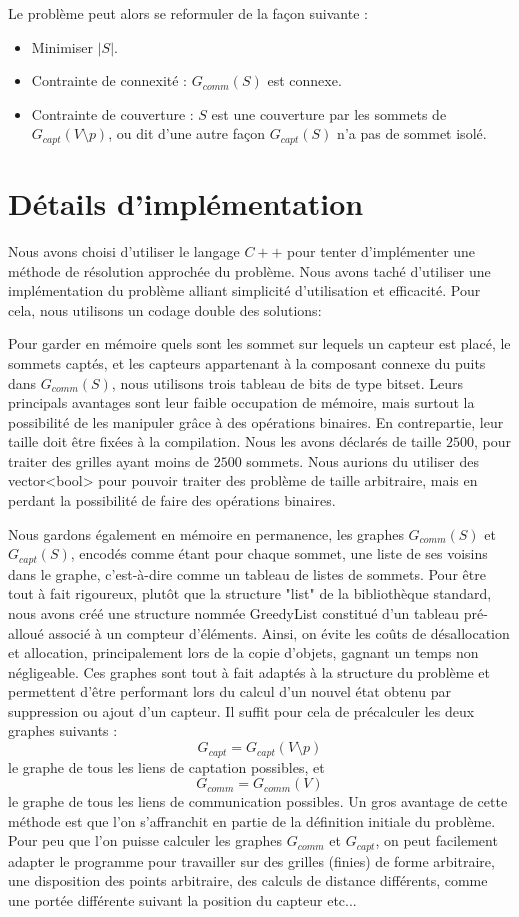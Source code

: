 \documentclass[12pt,a4paper]{article}
\begin{document}
Le problème peut alors se reformuler de la façon suivante :
\begin{itemize}
\item Minimiser $|S|$.
\item Contrainte de connexité : $G_{comm}(S)$ est connexe.
\item Contrainte de couverture : $S$ est une couverture par les sommets de $G_{capt}(V\setminus p)$, ou dit d'une autre façon $G_{capt}(S)$ n'a pas de sommet isolé.
\end{itemize}
\section{Détails d'implémentation}
Nous avons choisi d'utiliser le langage $C++$ pour tenter d'implémenter une méthode de résolution approchée du problème. Nous avons taché d'utiliser une implémentation du problème alliant simplicité d'utilisation et efficacité. Pour cela, nous utilisons un codage double des solutions:

Pour garder en mémoire quels sont les sommet sur lequels un capteur est placé, le sommets captés, et les capteurs appartenant à la composant connexe du puits dans $G_{comm}(S)$, nous utilisons trois tableau de bits de type bitset. Leurs principals avantages sont leur faible occupation de mémoire, mais surtout la possibilité de les manipuler grâce à des opérations binaires. En contrepartie, leur taille doit être fixées à la compilation. Nous les avons déclarés de taille $2500$, pour traiter des grilles ayant moins de $2500$ sommets. Nous aurions du utiliser des vector<bool> pour pouvoir traiter des problème de taille arbitraire, mais en perdant la possibilité de faire des opérations binaires.

Nous gardons également en mémoire en permanence, les graphes $G_{comm}(S)$ et $G_{capt}(S)$, encodés comme étant pour chaque sommet, une liste de ses voisins dans le graphe, c'est-à-dire comme un tableau de listes de sommets. Pour être tout à fait rigoureux, plutôt que la structure "list" de la bibliothèque standard, nous avons créé une structure nommée GreedyList constitué d'un tableau pré-alloué associé à un compteur d'éléments. Ainsi, on évite les coûts de désallocation et allocation, principalement lors de la copie d'objets, gagnant un temps non négligeable. Ces graphes sont tout à fait  adaptés à la structure du problème et permettent d'être performant lors du calcul d'un nouvel état obtenu par suppression ou ajout d'un capteur. Il suffit pour cela de précalculer les deux graphes suivants : \[G_{capt}=G_{capt}(V\setminus p)\] le graphe de tous les liens de captation possibles, et \[G_{comm}=G_{comm}(V)\] le graphe de tous les liens de communication possibles. Un gros avantage de cette méthode est que l'on s'affranchit en partie de la définition initiale du problème. Pour peu que l'on puisse calculer les graphes $G_{comm}$ et $G_{capt}$, on peut facilement adapter le programme pour travailler sur des grilles (finies) de forme arbitraire, une disposition des points arbitraire, des calculs de distance différents, comme une portée différente suivant la position du capteur etc...
\end{document}
